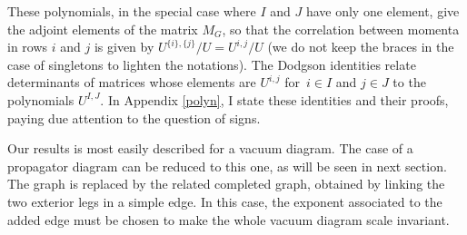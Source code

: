 \documentclass[11pt]{article}
\numberwithin{equation}{section}
\begin{document}
These polynomials, in the special case where $I$ and $J$ have only one element,
give the adjoint elements of the matrix $M_G$, so that the correlation between momenta in rows
$i$ and $j$ is given by $U^{\{i\},\{j\}}/U=U^{i,j}/U$ (we do not keep the braces in the case of
singletons to lighten the notations). The Dodgson identities relate determinants of matrices whose elements
are $U^{i,j}$ for~${i \in I}$ and $j \in J$ to the polynomials $U^{I ,J}$. In Appendix \ref{polyn}, I state these
identities and their proofs, paying due attention to the question of signs.

Our results is most easily described for a vacuum diagram. The case of a propagator diagram can be reduced to this one, as will be seen in next
section.
The graph is replaced by the related completed graph,
obtained by linking the two exterior legs in a simple edge. In this case, the exponent associated to the added edge
must be chosen to make the whole vacuum diagram scale invariant.
\end{document}
